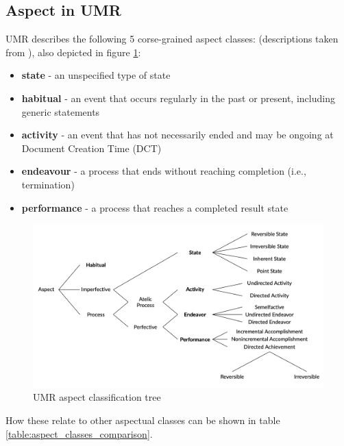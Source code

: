 \subsection*{Aspect in UMR}
UMR describes the following 5 corse-grained aspect classes: (descriptions taken from \citet{umr}), also depicted in figure \ref{fig:umr_aspect_tree}:
\begin{itemize}
    \item \textbf{state} - an unspecified type of state
    \item \textbf{habitual} - an event that occurs regularly in the past or
    present, including generic statements
    \item \textbf{activity} - an event that has not necessarily ended and may
    be ongoing at Document Creation Time (DCT)
    \item \textbf{endeavour} - a process that ends without reaching completion
    (i.e., termination)
    \item \textbf{performance} - a process that reaches a completed result
    state
\end{itemize}

\begin{figure}
    \includegraphics[width=\textwidth]{img/umr_aspct_tree.png}
    \caption{UMR aspect classification tree \citep{umrslides2022}}
    \label{fig:umr_aspect_tree}
\end{figure}

How these relate to other aspectual classes can be shown in table \ref{table:aspect_classes_comparison}.

